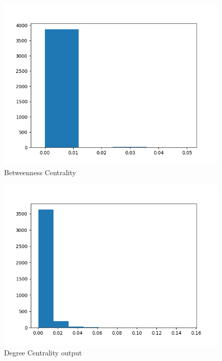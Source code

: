 \documentclass{article}
\begin{document}
\begin{figure}
    \centering
    \includegraphics[width=\textwidth,height=\textheight,keepaspectratio]{betweenness_centrality.png}
    \caption{Betweenness Centrality}
    \label{fig:part2betweenness}
\end{figure}

\begin{figure}
    \centering
    \includegraphics[width=\textwidth,height=\textheight,keepaspectratio]{degree_centrality.png}
    \caption{Degree Centrality output}
    \label{fig:part2degree}
\end{figure}
\end{document}
